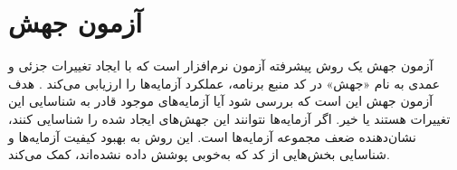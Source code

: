 \section{آزمون جهش}

آزمون جهش یک روش پیشرفته آزمون نرم‌افزار است که با ایجاد تغییرات جزئی و عمدی به نام «جهش» در کد منبع برنامه، عملکرد آزمایه‌ها را ارزیابی می‌کند \cite{parsai2020comparing}. هدف آزمون جهش این است که بررسی شود آیا آزمایه‌های موجود قادر به شناسایی این تغییرات هستند یا خیر. اگر آزمایه‌ها نتوانند این جهش‌های ایجاد شده را شناسایی کنند، نشان‌دهنده ضعف مجموعه آزمایه‌ها است. این روش به بهبود کیفیت آزمایه‌ها و شناسایی بخش‌هایی از کد که به‌خوبی پوشش داده نشده‌اند، کمک می‌کند.

